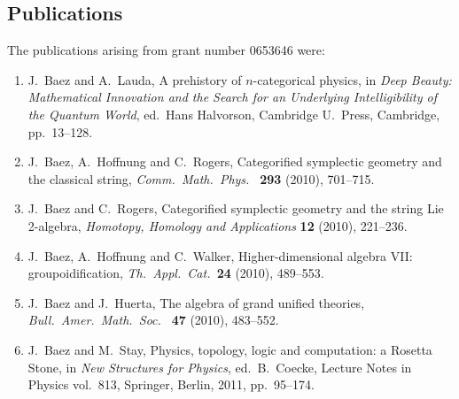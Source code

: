 \documentclass[12pt]{amsart}
\begin{document}
\subsection{Publications}

The publications arising from grant number  0653646 were:

\begin{enumerate}

\item J.\ Baez and A.\ Lauda, A prehistory of $n$-categorical physics, in {\sl Deep Beauty: Mathematical Innovation and the Search  for an Underlying Intelligibility of the Quantum World}, ed.\ Hans Halvorson, Cambridge U.\ Press, Cambridge, pp.\ 13--128.

\item J.\ Baez, A.\ Hoffnung and C.\ Rogers, Categorified symplectic geometry and the classical string, \textsl{Comm.\ Math.\ Phys.\  } {\bf 293} (2010), 701--715. 

\item J.\ Baez and C.\ Rogers, Categorified symplectic geometry and the string Lie 2-algebra,  {\sl Homotopy, Homology
and Applications} {\bf 12} (2010), 221--236.

\item J.\ Baez, A.\ Hoffnung and C.\ Walker,  Higher-dimensional algebra VII: groupoidification, {\sl Th.\ Appl.\ Cat.\ }{\bf 24} 
(2010), 489--553.

\item J.\ Baez and J.\ Huerta, The algebra of grand unified theories, \textsl{ Bull.\ Amer.\ Math.\ Soc.\ }{\bf 
47} (2010), 483--552.

\item J.\ Baez and M.\ Stay, Physics, topology, logic and computation: a Rosetta Stone, in {\sl New Structures for Physics}, ed.\ B.\ Coecke, Lecture Notes in Physics vol.\ 813, Springer, Berlin, 2011, pp.\ 95--174.

\end{enumerate}



\vfill

\pagebreak
\pagestyle{empty}
\end{document}

